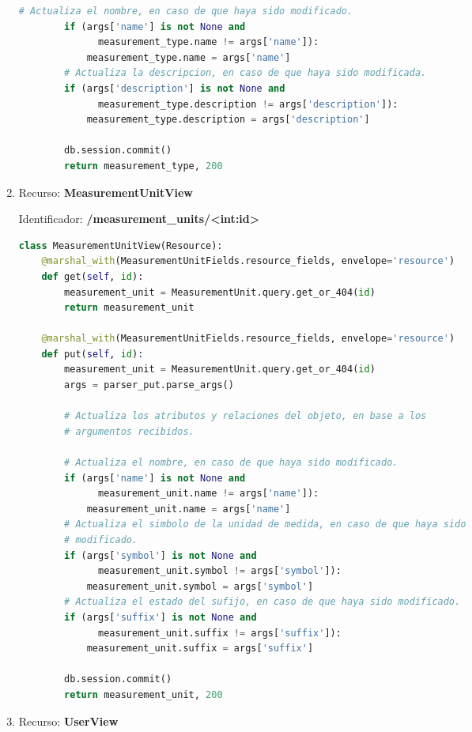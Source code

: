 \begin{enumerate}
\begin{lstlisting}[language=Python]
        # Actualiza el nombre, en caso de que haya sido modificado.
        if (args['name'] is not None and
              measurement_type.name != args['name']):
            measurement_type.name = args['name']
        # Actualiza la descripcion, en caso de que haya sido modificada.
        if (args['description'] is not None and
              measurement_type.description != args['description']):
            measurement_type.description = args['description']

        db.session.commit()
        return measurement_type, 200
\end{lstlisting}

\item Recurso: \textbf{MeasurementUnitView}

Identificador: \textbf{/measurement\_units/<int:id>}

\begin{lstlisting}[language=Python]
class MeasurementUnitView(Resource):
    @marshal_with(MeasurementUnitFields.resource_fields, envelope='resource')
    def get(self, id):
        measurement_unit = MeasurementUnit.query.get_or_404(id)
        return measurement_unit

    @marshal_with(MeasurementUnitFields.resource_fields, envelope='resource')
    def put(self, id):
        measurement_unit = MeasurementUnit.query.get_or_404(id)
        args = parser_put.parse_args()

        # Actualiza los atributos y relaciones del objeto, en base a los
        # argumentos recibidos.

        # Actualiza el nombre, en caso de que haya sido modificado.
        if (args['name'] is not None and
              measurement_unit.name != args['name']):
            measurement_unit.name = args['name']
        # Actualiza el simbolo de la unidad de medida, en caso de que haya sido
        # modificado.
        if (args['symbol'] is not None and
              measurement_unit.symbol != args['symbol']):
            measurement_unit.symbol = args['symbol']
        # Actualiza el estado del sufijo, en caso de que haya sido modificado.
        if (args['suffix'] is not None and
              measurement_unit.suffix != args['suffix']):
            measurement_unit.suffix = args['suffix']

        db.session.commit()
        return measurement_unit, 200
\end{lstlisting}

\item Recurso: \textbf{UserView}


\end{enumerate}
